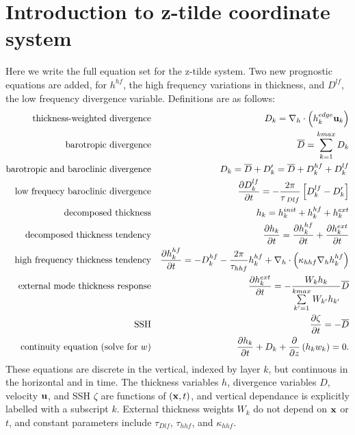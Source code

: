 \documentclass[11pt]{report}
\newcommand{\bea}{\begin{eqnarray}}
\newcommand{\eea}{\end{eqnarray}}
\begin{document}
\section{Introduction to z-tilde coordinate system}

Here we write the full equation set for the z-tilde system.
Two new prognostic equations are added, for $h^{hf}$, the high frequency variations in thickness, and $D^{lf}$, the low frequency divergence variable.  Definitions are as follows: 
\bea
\mbox{thickness-weighted divergence} && D_k = \nabla_h \cdot  \left( h^{edge}_k {\bf u}_k \right)  \label{D1} \\
\mbox{barotropic divergence} && {\overline D} = \sum\limits_{k=1}^{kmax} D_k  \\
\mbox{barotropic and baroclinic divergence} && D_k = {\overline D} + D_k' = {\overline D} + D^{hf}_k + D^{lf}_k \label{D}\\
\mbox{low frequecy baroclinic divergence} && 
  \frac{\partial D^{lf}_k}{\partial t} = - \frac{2\pi}{\tau_{\;Dlf}} \left[ D^{lf}_k - D'_k \right] \label{Dlf}\\
\mbox{decomposed thickness} && h_k = h^{init}_k + h^{hf}_k + h^{ext}_k \label{h} \\
\mbox{decomposed thickness tendency} && 
  \frac{\partial h_k}{\partial t} = \frac{\partial h^{hf}_k}{\partial t} + \frac{\partial h^{ext}_k}{\partial t} 
   \label{dhdt} \\
\mbox{high frequency thickness tendency} && 
  \frac{\partial h^{hf}_k}{\partial t} = - D^{hf}_k - \frac{2\pi}{\tau_{hhf}} h^{hf}_k 
   + \nabla_h\cdot \left( \kappa_{hhf} \nabla_h h^{hf}_k \right)
   \label{hhf} \\
\mbox{external mode thickness response} && 
  \frac{\partial h^{ext}_k}{\partial t} = - \frac{W_k h_k}{\sum\limits_{k'=1}^{kmax} W_{k'} h_{k'}}
  {\overline D} 
   \label{hext} \\
\mbox{SSH} && 
  \frac{\partial \zeta}{\partial t}  = -{\overline D}
   \label{ssh} \\
\mbox{continuity equation (solve for $w$)} && 
\label{cont} 
\frac{\partial h_k}{\partial t}  + D_k + \frac{\partial}{\partial z} \left( h_k w_k \right) = 0.
\eea
These equations are discrete in the vertical, indexed by layer $k$, but continuous in the horizontal and in time.  The thickness variables $h$, divergence variables $D$, velocity ${\bf u}$,  and SSH $\zeta$ are functions of $({\bf x},t)$, and vertical dependance is explicitly labelled with a subscript $k$.  External thickness weights $W_k$ do not depend on ${\bf x}$ or $t$, and constant parameters include 
$\tau_{Dlf}$, $\tau_{hhf}$, and $\kappa_{hhf}$.
\end{document}
